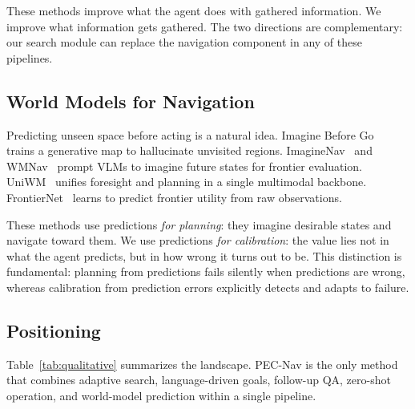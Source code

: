 \documentclass[10pt,twocolumn,letterpaper]{article}
\begin{document}
These methods improve what the agent does with gathered information. We improve what information gets gathered. The two directions are complementary: our search module can replace the navigation component in any of these pipelines.

\subsection{World Models for Navigation}

Predicting unseen space before acting is a natural idea. Imagine Before Go~\cite{zhang2024imaginebefore} trains a generative map to hallucinate unvisited regions. ImagineNav~\cite{zhao2024imaginenav} and WMNav~\cite{nie2025wmnav} prompt VLMs to imagine future states for frontier evaluation. UniWM~\cite{cheng2026uniwm} unifies foresight and planning in a single multimodal backbone. FrontierNet~\cite{sun2025frontiernet} learns to predict frontier utility from raw observations.

These methods use predictions \emph{for planning}: they imagine desirable states and navigate toward them. We use predictions \emph{for calibration}: the value lies not in what the agent predicts, but in how wrong it turns out to be. This distinction is fundamental: planning from predictions fails silently when predictions are wrong, whereas calibration from prediction errors explicitly detects and adapts to failure.

\subsection{Positioning}

Table~\ref{tab:qualitative} summarizes the landscape. PEC-Nav is the only method that combines adaptive search, language-driven goals, follow-up QA, zero-shot operation, and world-model prediction within a single pipeline.
\end{document}
